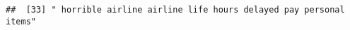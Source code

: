 \documentclass[
]{article}
\begin{document}
\begin{verbatim}
##  [33] " horrible airline airline life hours delayed pay personal items"                                                                                                                                                                                                                                                                                                                                                                                                                                                                                                                                                                                                                                                                                                                                                                                                                                                                                                                                                                                                                                                                                                                                                                                                                                                                                                                                                                                                                                                                                                                                                                                                                                                                                                                               

\end{verbatim}
\end{document}

